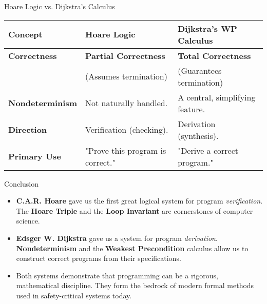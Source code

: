\documentclass[aspectratio=169]{beamer}
\begin{document}
\begin{frame}{Hoare Logic vs. Dijkstra's Calculus}
    \begin{tabular}{p{} p{} p{}}
        \toprule
        \textbf{Concept} & \textbf{Hoare Logic} & \textbf{Dijkstra's WP Calculus} \\
        \midrule
        \textbf{Correctness} & \textbf{Partial Correctness} & \textbf{Total Correctness} \\
        & (Assumes termination) & (Guarantees termination) \\
        \addlinespace
        \textbf{Nondeterminism} & Not naturally handled. & A central, simplifying feature. \\
        \addlinespace
        \textbf{Direction} & Verification (checking). & Derivation (synthesis). \\
        \addlinespace
        \textbf{Primary Use} & "Prove this program is correct." & "Derive a correct program." \\
        \bottomrule
    \end{tabular}
\end{frame}

\begin{frame}{Conclusion}
    \begin{itemize}
        \item \textbf{C.A.R. Hoare} gave us the first great logical system for program \textit{verification}. The \textbf{Hoare Triple} and the \textbf{Loop Invariant} are cornerstones of computer science.
        \vspace{1cm}
        \item \textbf{Edsger W. Dijkstra} gave us a system for program \textit{derivation}. \textbf{Nondeterminism} and the \textbf{Weakest Precondition} calculus allow us to construct correct programs from their specifications.
        \vspace{1cm}
        \item Both systems demonstrate that programming can be a rigorous, mathematical discipline. They form the bedrock of modern formal methods used in safety-critical systems today.
    \end{itemize}
\end{frame}
\end{document}
